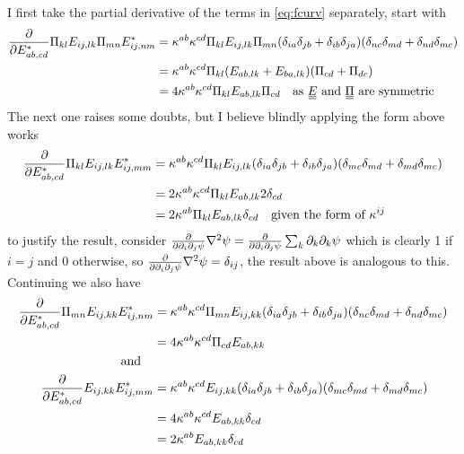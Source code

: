 \documentclass[11pt]{article}
\begin{document}
I first take the partial derivative of the terms in \cref{eq:fcurv} separately, start with
\begin{align}
    \pdv{E_{ab,cd}^*} \Pi_{kl}E_{ij,lk}\Pi_{mn}E_{ij,nm}^* &= \kappa^{ab}\kappa^{cd} \Pi_{kl}E_{ij,lk}\Pi_{mn} (\delta_{ia}\delta_{jb}+\delta_{ib}\delta_{ja}) (\delta_{nc}\delta_{md}+\delta_{nd}\delta_{mc}) \\
    &= \kappa^{ab}\kappa^{cd} \Pi_{kl}(E_{ab,lk}+E_{ba,lk})(\Pi_{cd}+\Pi_{dc}) \\
    &= 4\kappa^{ab}\kappa^{cd} \Pi_{kl}E_{ab,lk}\Pi_{cd} \qq{as \EE\ and \PP\ are symmetric}
\end{align}
The next one raises some doubts, but I believe blindly applying the form above works
\begin{align}
    \pdv{E_{ab,cd}^*} \Pi_{kl}E_{ij,lk}E_{ij,mm}^* &= \kappa^{ab}\kappa^{cd} \Pi_{kl}E_{ij,lk} (\delta_{ia}\delta_{jb}+\delta_{ib}\delta_{ja}) (\delta_{mc}\delta_{md}+\delta_{md}\delta_{mc}) \\
    &= 2\kappa^{ab}\kappa^{cd} \Pi_{kl}E_{ab,lk} 2\delta_{cd} \\
    &= 2\kappa^{ab} \Pi_{kl}E_{ab,lk} \delta_{cd} \qq{given the form of $\kappa^{ij}$}
\end{align}
to justify the result, consider $\pdv{\partial_i \partial_j \psi} \nabla^2 \psi = \pdv{\partial_i \partial_j \psi} \sum_k \partial_k \partial_k \psi$ which is clearly 1 if $i=j$ and 0 otherwise, so $\pdv{\partial_i \partial_j \psi} \nabla^2 \psi=\delta_{ij}$, the result above is analogous to this.
Continuing we also have
\begin{align}
    \pdv{E_{ab,cd}^*} \Pi_{mn}E_{ij,kk}E_{ij,nm}^* &= \kappa^{ab}\kappa^{cd} \Pi_{mn}E_{ij,kk} (\delta_{ia}\delta_{jb}+\delta_{ib}\delta_{ja}) (\delta_{nc}\delta_{md}+\delta_{nd}\delta_{mc}) \\
    &= 4\kappa^{ab}\kappa^{cd} \Pi_{cd}E_{ab,kk} \\
    \qq{and}& \nonumber \\
    \pdv{E_{ab,cd}^*} E_{ij,kk}E_{ij,mm}^* &= \kappa^{ab}\kappa^{cd} E_{ij,kk} (\delta_{ia}\delta_{jb}+\delta_{ib}\delta_{ja}) (\delta_{mc}\delta_{md}+\delta_{md}\delta_{mc}) \\
    &= 4\kappa^{ab}\kappa^{cd} E_{ab,kk} \delta_{cd} \\
    &= 2\kappa^{ab} E_{ab,kk} \delta_{cd}
\end{align}

\pagebreak
\end{document}
